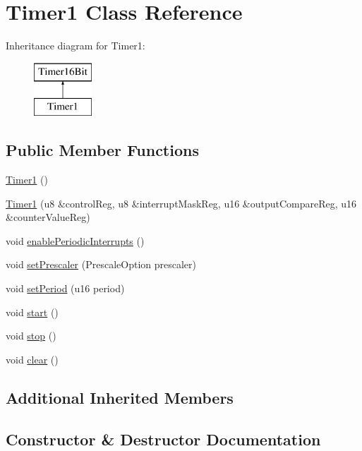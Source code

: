 \hypertarget{class_timer1}{}\section{Timer1 Class Reference}
\label{class_timer1}
Inheritance diagram for Timer1\+:\begin{figure}[H]
\begin{center}
\leavevmode
\includegraphics[height=2.000000cm]{class_timer1}
\end{center}
\end{figure}
\subsection*{Public Member Functions}
\begin{DoxyCompactItemize}
\item 
\mbox{\hyperlink{class_timer1_a899c49d4c508ade399a54de9a1a85aeb}{Timer1}} ()
\item 
\mbox{\hyperlink{class_timer1_aef700b65fd584470d6d672ff5df5e6fa}{Timer1}} (u8 \&control\+Reg, u8 \&interrupt\+Mask\+Reg, u16 \&output\+Compare\+Reg, u16 \&counter\+Value\+Reg)
\item 
void \mbox{\hyperlink{class_timer1_adffa570f7391a22de1f6ae1673cd2861}{enable\+Periodic\+Interrupts}} ()
\item 
void \mbox{\hyperlink{class_timer1_a4e841a09f12c8de397440cf6cd74fa4b}{set\+Prescaler}} (Prescale\+Option prescaler)
\item 
void \mbox{\hyperlink{class_timer1_a0aa1eeb582f2a3360f2cb53678c726f9}{set\+Period}} (u16 period)
\item 
void \mbox{\hyperlink{class_timer1_a29031bd6078a40cde7e782628b598035}{start}} ()
\item 
void \mbox{\hyperlink{class_timer1_ace3cab44330dd29aec8182f9a4dfa6f4}{stop}} ()
\item 
void \mbox{\hyperlink{class_timer1_a86a26557d431f334c14524a4c63b2bbe}{clear}} ()
\end{DoxyCompactItemize}
\subsection*{Additional Inherited Members}


\subsection{Constructor \& Destructor Documentation}
\mbox{\label{class_timer1_a899c49d4c508ade399a54de9a1a85aeb}} 
